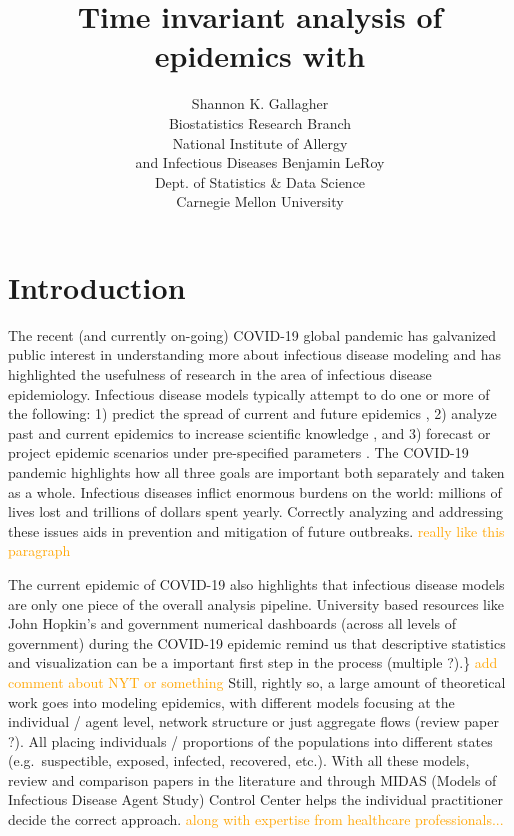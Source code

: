 \documentclass[
  shortnames]{jss}
\author{
Shannon K. Gallagher\\Biostatistics Research Branch\\
National Institute of Allergy\\
and Infectious Diseases \And Benjamin LeRoy\\Dept. of Statistics \& Data Science\\
Carnegie Mellon University
}
\title{Time invariant analysis of epidemics with \pkg{EpiCompare}}
\begin{document}
\newcommand{\shannon}[1]{\textcolor{orange}{#1}}
\newcommand{\ben}[1]{\textcolor{violet}{#1}}

\newtheorem{theorem}{Theorem}

\section[Intro]{Introduction}\label{sec:intro}

The recent (and currently on-going) COVID-19 global pandemic has
galvanized public interest in understanding more about infectious
disease modeling and has highlighted the usefulness of research in the
area of infectious disease epidemiology. Infectious disease models
typically attempt to do one or more of the following: 1) predict the
spread of current and future epidemics
\citep[e.g. flue prediction][]{Biggerstaff2016}, 2) analyze past and
current epidemics to increase scientific knowledge
\citep[e.g. historical measle outbreaks][]{Neal2004}, and 3) forecast or
project epidemic scenarios under pre-specified parameters
\citep[e.g. ...][]{}. The COVID-19 pandemic highlights how all three
goals are important both separately and taken as a whole. Infectious
diseases inflict enormous burdens on the world: millions of lives lost
and trillions of dollars spent yearly. Correctly analyzing and
addressing these issues aids in prevention and mitigation of future
outbreaks. \textcolor{orange}{really like this paragraph}

The current epidemic of COVID-19 also highlights that infectious disease
models are only one piece of the overall analysis pipeline. University
based resources like John Hopkin's and government numerical dashboards
(across all levels of government) during the COVID-19 epidemic remind us
that descriptive statistics and visualization can be a important first
step in the process (multiple \cite{}?).\}
\textcolor{orange}{add comment about NYT or something} Still, rightly
so, a large amount of theoretical work goes into modeling epidemics,
with different models focusing at the individual / agent level, network
structure or just aggregate flows (review paper \cite{}?). All placing
individuals / proportions of the populations into different states
(e.g.~suspectible, exposed, infected, recovered, etc.). With all these
models, review and comparison papers in the literature and through MIDAS
(Models of Infectious Disease Agent Study) Control Center helps the
individual practitioner decide the correct approach.
\textcolor{orange}{along with expertise from healthcare professionals...}
\end{document}
